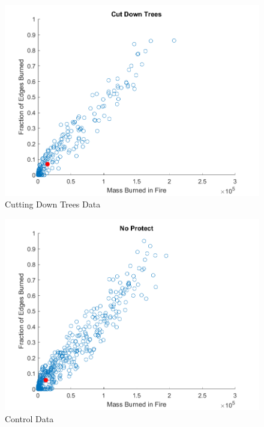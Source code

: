 \documentclass[ aps, pra, reprint, notitlepage ]{revtex4-1}
\begin{document}
\begin{figure}[ht]
	\includegraphics[scale=0.6]{Data/CutDownTrees}
	\caption{\label{CutTrees} Cutting Down Trees Data}
\end{figure}
\begin{figure}[ht]
	\includegraphics[scale=0.6]{Data/NoProtect}
	\caption{\label{NoProtect} Control Data}
\end{figure}
\end{document}
